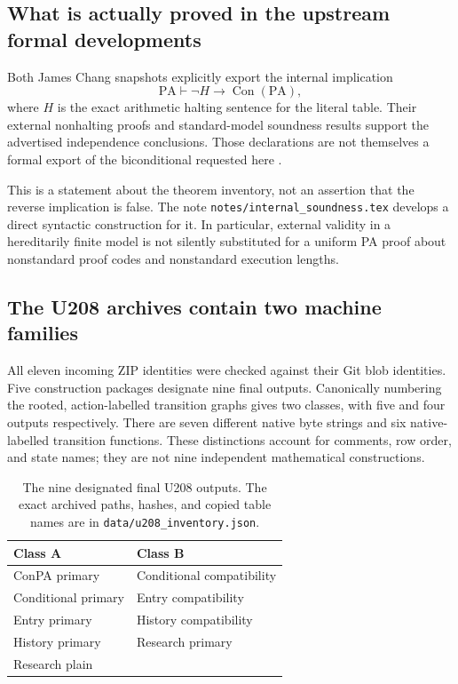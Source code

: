 \documentclass[11pt,letterpaper]{article}
\newcommand{\PA}{\mathrm{PA}}
\newcommand{\Con}{\operatorname{Con}}
\newcommand{\file}[1]{\texttt{\nolinkurl{#1}}}
\begin{document}
\subsection{What is actually proved in the upstream formal developments}

Both James Chang snapshots explicitly export the internal implication
\[
        \PA\vdash\neg H\longrightarrow\Con(\PA),
\]
where $H$ is the exact arithmetic halting sentence for the literal table.
Their external nonhalting proofs and standard-model soundness results
support the advertised independence conclusions. Those declarations are
not themselves a formal export of the biconditional requested here
\cite{pa196result,pa209result}.

This is a statement about the theorem inventory, not an assertion that the
reverse implication is false. The note
\file{notes/internal_soundness.tex} develops a direct syntactic construction
for it. In particular, external validity in a hereditarily finite model is
not silently substituted for a uniform PA proof about nonstandard proof
codes and nonstandard execution lengths.

\subsection{The U208 archives contain two machine families}

All eleven incoming ZIP identities were checked against their Git blob
identities. Five construction packages designate nine final outputs.
Canonically numbering the rooted, action-labelled transition graphs gives
two classes, with five and four outputs respectively. There are seven
different native byte strings and six native-labelled transition functions.
These distinctions account for comments, row order, and state names; they
are not nine independent mathematical constructions.

\begin{table}[ht]
\centering\small
\begin{tabular}{@{}ll@{}}
\toprule
Class A & Class B\\
\midrule
ConPA primary & Conditional compatibility\\
Conditional primary & Entry compatibility\\
Entry primary & History compatibility\\
History primary & Research primary\\
Research plain & \\
\bottomrule
\end{tabular}
\caption{The nine designated final U208 outputs. The exact archived paths,
hashes, and copied table names are in \file{data/u208_inventory.json}.}
\end{table}
\end{document}
